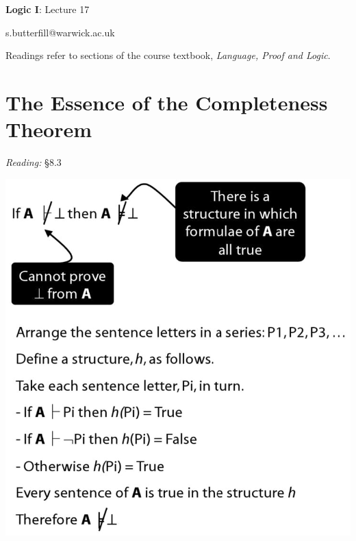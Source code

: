\documentclass[12pt]{extarticle}
\date{}
\makeatletter
\def \ititle {Origins of Mind}
\def \isubtitle {Lecture 08}
\def \iemail{s.butterfill@warwick.ac.uk}
\makeatother
\begin{document}

\begin{multicols*}{3}

\setlength\footnotesep{1em}







\def \ititle {Logic I}
 
\def \isubtitle {Lecture 17}
 
\begin{center}
 
{\Large
 
\textbf{\ititle}: \isubtitle
 
}
 
 
 
\iemail %
 
\end{center}
 
Readings refer to sections of the course textbook, \emph{Language, Proof and Logic}.
 
 
 
\section{The Essence of the Completeness Theorem}
 
\emph{Reading:} §8.3
 
\begin{center}
\includegraphics[scale=0.3]{img/unit_450.png}
\end{center}
 

\end{multicols*}
\end{document}
